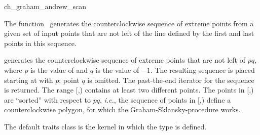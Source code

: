

\begin{ccRefFunction}{ch_graham_andrew_scan}  %

\ccDefinition
  
The function \ccRefName\ generates the counterclockwise sequence of extreme
points from a given set of input points that are not left of the line defined
by the first and last points in this sequence.  



           {generates the counterclockwise sequence of extreme points that are
            not left of $pq$, where $p$ is the value of  and $q$ is
            the value of  $-1$. The resulting sequence is placed
            starting at  with $p$; point $q$ is omitted.  The
            past-the-end iterator for the sequence is returned.
            \ccPrecond %
            The range [,) contains at least
            two different points.
            The points in [,) are ``sorted'' with respect
            to $pq$, {\it i.e.}, the sequence of points in 
            [,) define a counterclockwise polygon, 
            for which the Graham-Sklansky-procedure \cite{s-mcrm-72} works.}

The default traits class  is the kernel in which the
type  is defined.



\end{ccRefFunction}
